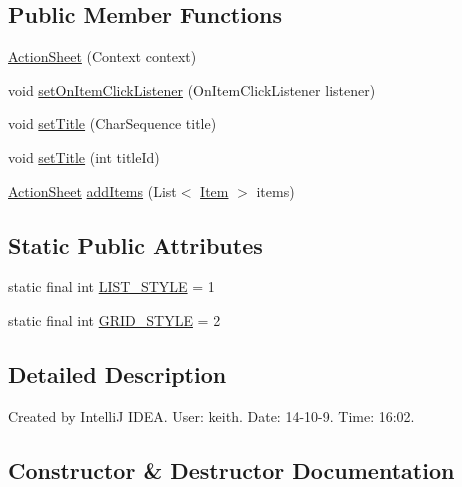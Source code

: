 \subsection*{Public Member Functions}
\begin{DoxyCompactItemize}
\item 
\hyperlink{classcom_1_1material_1_1widget_1_1_action_sheet_a400f9abe1a0d4c4df0153230811b08fc}{Action\+Sheet} (Context context)
\item 
void \hyperlink{classcom_1_1material_1_1widget_1_1_action_sheet_a228dc1e980bd262ce8ee2cd9847ee141}{set\+On\+Item\+Click\+Listener} (On\+Item\+Click\+Listener listener)
\item 
void \hyperlink{classcom_1_1material_1_1widget_1_1_action_sheet_ac86a28b16e8a07509a296f8e850b42c2}{set\+Title} (Char\+Sequence title)
\item 
void \hyperlink{classcom_1_1material_1_1widget_1_1_action_sheet_afae28097e24b3a539c975d15ab77f7d1}{set\+Title} (int title\+Id)
\item 
\hyperlink{classcom_1_1material_1_1widget_1_1_action_sheet}{Action\+Sheet} \hyperlink{classcom_1_1material_1_1widget_1_1_action_sheet_a7a7bace5c73bbb7642d5a18e5db3041a}{add\+Items} (List$<$ \hyperlink{classcom_1_1material_1_1widget_1_1_action_sheet_1_1_item}{Item} $>$ items)
\end{DoxyCompactItemize}
\subsection*{Static Public Attributes}
\begin{DoxyCompactItemize}
\item 
static final int \hyperlink{classcom_1_1material_1_1widget_1_1_action_sheet_ac49e86ce59a329ae7361381e3fc8cdfc}{L\+I\+S\+T\+\_\+\+S\+T\+Y\+LE} = 1
\item 
static final int \hyperlink{classcom_1_1material_1_1widget_1_1_action_sheet_a946a0dc5a18e0aea16564ab846a73162}{G\+R\+I\+D\+\_\+\+S\+T\+Y\+LE} = 2
\end{DoxyCompactItemize}


\subsection{Detailed Description}
Created by IntelliJ I\+D\+EA. User\+: keith. Date\+: 14-\/10-\/9. Time\+: 16\+:02. 

\subsection{Constructor \& Destructor Documentation}
\mbox{\label{classcom_1_1material_1_1widget_1_1_action_sheet_a400f9abe1a0d4c4df0153230811b08fc}} 
